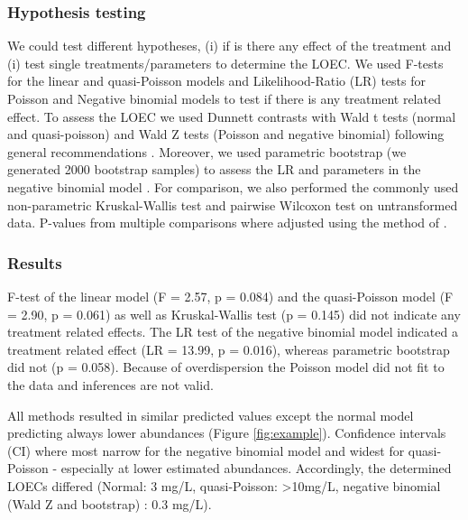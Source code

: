 \documentclass{scrartcl}
\begin{document}
\subsubsection{Hypothesis testing}

We could test different hypotheses, (i) if is there any effect of the treatment and (i) test single treatments/parameters to determine the LOEC.
We used F-tests for the linear and quasi-Poisson models and Likelihood-Ratio (LR) tests for Poisson and Negative binomial models to test if there is any treatment related effect.
To assess the LOEC we used Dunnett contrasts with Wald t tests (normal and quasi-poisson) and Wald Z tests (Poisson and negative binomial) following general recommendations \citep{bolker_generalized_2009}. 
Moreover, we used parametric bootstrap (we generated 2000 bootstrap samples) to assess the LR and parameters in the negative binomial model \citep{faraway_extending_2006}.
For comparison, we also performed the commonly used non-parametric Kruskal-Wallis test and pairwise Wilcoxon test on untransformed data.
P-values from multiple comparisons where adjusted using the method of \citet{holm_simple_1979}.


\subsubsection{Results}
F-test of the linear model  (F = 2.57, p = 0.084) and the quasi-Poisson model (F = 2.90, p = 0.061) as well as Kruskal-Wallis test (p = 0.145) did not indicate any treatment related effects.
The LR test of the negative binomial model indicated a treatment related effect (LR = 13.99, p = 0.016), whereas parametric bootstrap did not (p = 0.058).
Because of overdispersion the Poisson model did not fit to the data and inferences are not valid.

All methods resulted in similar predicted values except the normal model predicting always lower abundances (Figure \ref{fig:example}). 
Confidence intervals (CI) where most narrow for the negative binomial model and widest for quasi-Poisson - especially at lower estimated abundances.
Accordingly, the determined LOECs differed (Normal: 3 mg/L, quasi-Poisson: \textgreater 10mg/L, negative binomial (Wald Z and bootstrap) : 0.3 mg/L).
\end{document}
